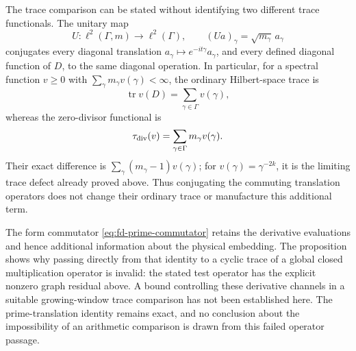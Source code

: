 The trace comparison can be stated without identifying two different
trace functionals. The unitary map
\[
 U:\ell^2(\Gamma,m)\longrightarrow\ell^2(\Gamma),
 \qquad (Ua)_\gamma=\sqrt{m_\gamma}\,a_\gamma
\]
conjugates every diagonal translation
\(a_\gamma\mapsto e^{-it\gamma}a_\gamma\), and every defined
diagonal function of \(D\), to the same diagonal operation. In
particular, for a spectral function \(v\ge0\) with
\(\sum_\gamma m_\gamma v(\gamma)<\infty\),
the ordinary Hilbert-space trace is
\[
 \operatorname{tr}v(D)=\sum_{\gamma\in\Gamma}v(\gamma),
\]
whereas the zero-divisor functional is
\[
 \tau_{\rm div}(v)=\sum_{\gamma\in\Gamma}m_\gamma v(\gamma).
\]
Their exact difference is
\(\sum_\gamma(m_\gamma-1)v(\gamma)\); for
\(v(\gamma)=\gamma^{-2k}\), it is the limiting trace defect
already proved above. Thus conjugating the commuting translation
operators does not change their ordinary trace or manufacture this
additional term.

The form commutator \eqref{eq:fd-prime-commutator} retains the
derivative evaluations and hence additional information about the
physical embedding. The proposition shows why passing directly from
that identity to a cyclic trace of a global closed multiplication
operator is invalid: the stated test operator has the explicit
nonzero graph residual above. A bound controlling these derivative
channels in a suitable growing-window trace comparison has not been
established here. The prime-translation identity remains exact, and
no conclusion about the impossibility of an arithmetic comparison
is drawn from this failed operator passage.
